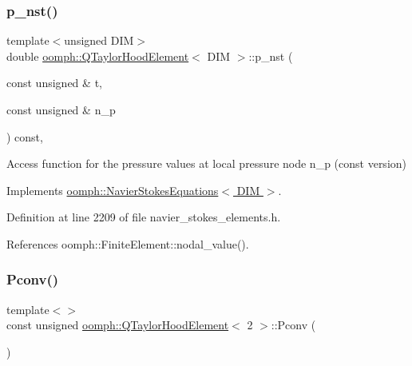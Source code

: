 \subsubsection{\texorpdfstring{p\+\_\+nst()}{p\_nst()}\hspace{0.1cm}{\footnotesize\ttfamily [2/2]}}
{\footnotesize\ttfamily template$<$unsigned D\+IM$>$ \\
double \hyperlink{classoomph_1_1QTaylorHoodElement}{oomph\+::\+Q\+Taylor\+Hood\+Element}$<$ D\+IM $>$\+::p\+\_\+nst (\begin{DoxyParamCaption}\item[{const unsigned \&}]{t,  }\item[{const unsigned \&}]{n\+\_\+p }\end{DoxyParamCaption}) const\hspace{0.3cm}{\ttfamily [inline]}, {\ttfamily [virtual]}}



Access function for the pressure values at local pressure node n\+\_\+p (const version) 



Implements \hyperlink{classoomph_1_1NavierStokesEquations_a0a39f638a61fd9a6c999c16e94deb31b}{oomph\+::\+Navier\+Stokes\+Equations$<$ D\+I\+M $>$}.



Definition at line 2209 of file navier\+\_\+stokes\+\_\+elements.\+h.



References oomph\+::\+Finite\+Element\+::nodal\+\_\+value().

\mbox{\label{classoomph_1_1QTaylorHoodElement_aae4914bdf9325f6f4309e87651bb3acb}} 
\subsubsection{\texorpdfstring{Pconv()}{Pconv()}\hspace{0.1cm}{\footnotesize\ttfamily [1/2]}}
{\footnotesize\ttfamily template$<$$>$ \\
const unsigned \hyperlink{classoomph_1_1QTaylorHoodElement}{oomph\+::\+Q\+Taylor\+Hood\+Element}$<$ 2 $>$\+::Pconv (\begin{DoxyParamCaption}{ }\end{DoxyParamCaption})\hspace{0.3cm}{\ttfamily [protected]}}



